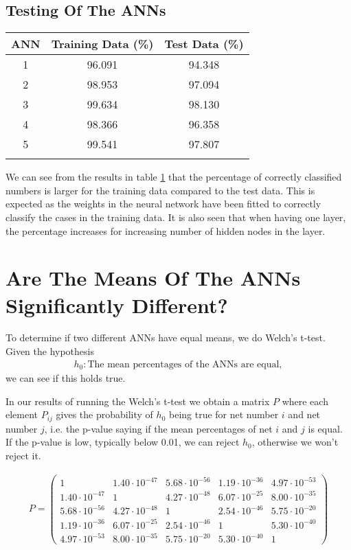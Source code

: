 \documentclass[11pt,a4paper]{article}
\begin{document}
\subsection{Testing Of The ANNs}

\begin{table}
\centering
\begin{tabular}{ c c c }\label{tab:meanPercentage}
ANN & Training Data (\%) & Test Data (\%)
 \\
  \hline  
  1 & 96.091 & 94.348\\
  2 & 98.953 & 97.094\\
  3 & 99.634 & 98.130\\
  4 & 98.366 & 96.358\\
  5 & 99.541 & 97.807\\
  \hline\\
\end{tabular}
\end{table}

We can see from the results in table \ref{tab:meanPercentage} that the percentage of correctly classified numbers is larger for the training data compared to the test data. This is expected as the weights in the neural network have been fitted to correctly classify the cases in the training data. It is also seen that when having one layer, the percentage increases for increasing number of hidden nodes in the layer.

\section{Are The Means Of The ANNs Significantly Different?}
To determine if two different ANNs have equal means, we do Welch's t-test. Given the hypothesis
\begin{align}
h_0: \textrm{The mean percentages of the ANNs are equal},
\end{align}
we can see if this holds true. 

In our results of running the Welch's t-test we obtain a matrix $P$ where each element $P_{ij}$ gives the probability of $h_0$ being true for net number $i$ and net number $j$, i.e. the p-value saying if the mean percentages of net $i$ and $j$ is equal. If the p-value is low, typically below 0.01, we can reject $h_0$, otherwise we won't reject it.

\begin{align} \label{tab:welchTable}
P = \begin{pmatrix}
1 & 1.40\cdot10^{-47} & 5.68\cdot10^{-56} & 1.19\cdot10^{-36} & 4.97\cdot10^{-53}\\
1.40\cdot10^{-47} & 1 & 4.27\cdot10^{-48} & 6.07\cdot10^{-25} & 8.00\cdot10^{-35}\\
5.68\cdot10^{-56} & 4.27\cdot10^{-48} & 1 & 2.54\cdot10^{-46} & 5.75\cdot10^{-20}\\
1.19\cdot10^{-36} & 6.07\cdot10^{-25} & 2.54\cdot10^{-46} & 1 & 5.30\cdot10^{-40}\\
4.97\cdot10^{-53} & 8.00\cdot10^{-35} & 5.75\cdot10^{-20} & 5.30\cdot10^{-40} & 1
\end{pmatrix}
\end{align}
\end{document}
